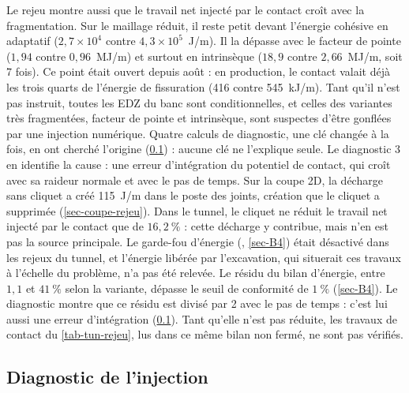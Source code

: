 Le rejeu montre aussi que le travail net injecté par le contact croît avec la fragmentation. Sur le maillage réduit, il reste petit devant l'énergie cohésive en adaptatif ($2{,}7\times10^4$ contre $4{,}3\times10^5$~J/m). Il la dépasse avec le facteur de pointe ($1{,}94$ contre $0{,}96$~MJ/m) et surtout en intrinsèque ($18{,}9$ contre $2{,}66$~MJ/m, soit 7 fois). Ce point était ouvert depuis août : en production, le contact valait déjà les trois quarts de l'énergie de fissuration (416 contre 545~kJ/m). Tant qu'il n'est pas instruit, toutes les EDZ du banc sont conditionnelles, et celles des variantes très fragmentées, facteur de pointe et intrinsèque, sont suspectes d'être gonflées par une injection numérique. Quatre calculs de diagnostic, une clé changée à la fois, en ont cherché l'origine (\cref{sec-tunnel-diag}) : aucune clé ne l'explique seule. Le diagnostic 3 en identifie la cause : une erreur d'intégration du potentiel de contact, qui croît avec sa raideur normale et avec le pas de temps. Sur la coupe 2D, la décharge  sans cliquet a créé 115~J/m dans le poste des joints, création que le cliquet a supprimée (\cref{sec-coupe-rejeu}). Dans le tunnel, le cliquet ne réduit le travail net injecté par le contact que de $16{,}2~\%$ : cette décharge y contribue, mais n'en est pas la source principale. Le garde-fou d'énergie (, \cref{sec-B4}) était désactivé dans les rejeux du tunnel, et l'énergie libérée par l'excavation, qui situerait ces travaux à l'échelle du problème, n'a pas été relevée. Le résidu du bilan d'énergie, entre $1{,}1$ et $41~\%$ selon la variante, dépasse le seuil de conformité de $1~\%$ (\cref{sec-B4}). Le diagnostic montre que ce résidu est divisé par 2 avec le pas de temps : c'est lui aussi une erreur d'intégration (\cref{sec-tunnel-diag}). Tant qu'elle n'est pas réduite, les travaux de contact du \cref{tab-tun-rejeu}, lus dans ce même bilan non fermé, ne sont pas vérifiés.

\subsection{Diagnostic de l'injection}
\label{sec-tunnel-diag}

